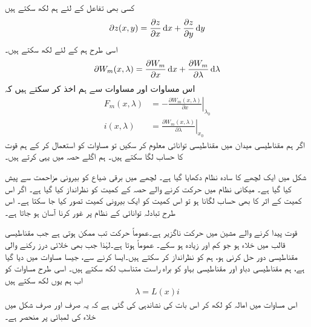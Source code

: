 	کسی بھی تفاعل  کے لئے ہم لکھ سکتے ہیں
\begin{align}\label{مساوات_تبادلہ_جزوی_تفرق_عمومی_الف}
\partial z(x,y)=\frac{\partial z}{\partial x} \dif x+\frac{\partial z}{\partial y} \dif y
\end{align}
اسی طرح ہم  کے لئے لکھ سکتے ہیں۔
\begin{align}\label{مساوات_تبادلہ_جزوی_تفرق_عمومی_ب}
\partial W_m(x,\lambda)=\frac{\partial W_m}{\partial x}\dif x+\frac{\partial W_m}{\partial \lambda}\dif \lambda
\end{align}
اس مساوات اور مساوات  سے ہم اخذ کر سکتے ہیں کہ
\begin{align}
F_m(x,\lambda)&=-\left. \frac{\partial W_m(x,\lambda)}{\partial x}\right|_{\lambda_0}\label{مساوات_تبادلہ_توانائی_قوت_برقی_رو}\\
i(x,\lambda)&=\left. \frac{\partial W_m(x,\lambda)}{\partial \lambda}\right|_{x_0}\label{مساوات_تبادلہ_توانائی_سے_رو}
\end{align}
اگر ہم مقناطیسی میدان میں مقناطیسی توانائی  معلوم کر سکیں تو مساوات   کو استعمال کر کے ہم قوت کا حساب لگا سکتے ہیں۔ ہم اگلے حصہ میں یہی کرتے ہیں۔

شکل   میں  ایک لچھے کا سادہ نظام دکھایا گیا ہے۔ لچھے میں برقی ضیاع کو بیرونی مزاحمت سے پیش کیا گیا ہے۔ میکانی نظام میں حرکت کرنے والے حصہ کے کمیت کو نظرانداز کیا گیا ہے۔ اگر اس کمیت  کے اثر کا بھی حساب لگانا ہو تو اس کمیت کو ایک بیرونی کمیت تصور کیا جا سکتا ہے۔ اس طرح تبادلہ توانائی کے نظام پر غور کرنا آسان ہو جاتا ہے۔ 

قوت پیدا کرنے والے مشین میں حرکت ناگزیر ہے۔عموماً حرکت تب ممکن ہوتی ہے جب مقناطیسی قالب میں خلاء ہو جو کم اور زیادہ ہو سکے۔  عموماً  ہوتا ہے۔لہٰذا جب بھی خلائی درز رکنے والی  مقناطیسی دور حل کرنی ہو،  ہم  کو نظرانداز کر سکتے ہیں۔ایسا کرنے سے، جیسا مساوات   میں دیا گیا ہے، ہم  مقناطیسی دباو  اور مقناطیسی بہاو  کو براہ راست متناسب لکھ سکتے ہیں۔ اسی طرح مساوات    کو اب  ہم  یوں لکھ سکتے ہیں
\begin{align}\label{مساوات_تبادلہ_ارتباط_بہاو_اور_امالہ}
\lambda=L(x) i
\end{align}
اس مساوات میں امالہ  کو  لکھ کر اس بات کی نشاندہی کی گئی ہے کہ یہ صرف اور صرف  شکل    میں خلاء کی لمبائی  پر منحصر ہے۔

